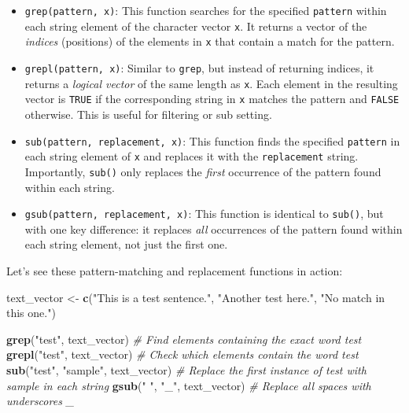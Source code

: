 \documentclass[
]{book}
\newenvironment{Shaded}{\begin{snugshade}}{\end{snugshade}}
\newcommand{\CommentTok}[1]{\textcolor[rgb]{0.56,0.35,0.01}{\textit{#1}}}
\newcommand{\FunctionTok}[1]{\textcolor[rgb]{0.13,0.29,0.53}{\textbf{#1}}}
\newcommand{\NormalTok}[1]{#1}
\newcommand{\OtherTok}[1]{\textcolor[rgb]{0.56,0.35,0.01}{#1}}
\newcommand{\StringTok}[1]{\textcolor[rgb]{0.31,0.60,0.02}{#1}}
\providecommand{\tightlist}{%
  \setlength{\itemsep}{0pt}\setlength{\parskip}{0pt}}
\begin{document}
\begin{itemize}
\tightlist
\item
  \texttt{grep(pattern,\ x)}: This function searches for the specified \texttt{pattern} within each string element of the character vector \texttt{x}. It returns a vector of the \emph{indices} (positions) of the elements in \texttt{x} that contain a match for the pattern.
\item
  \texttt{grepl(pattern,\ x)}: Similar to \texttt{grep}, but instead of returning indices, it returns a \emph{logical vector} of the same length as \texttt{x}. Each element in the resulting vector is \texttt{TRUE} if the corresponding string in \texttt{x} matches the pattern and \texttt{FALSE} otherwise. This is useful for filtering or sub setting.
\item
  \texttt{sub(pattern,\ replacement,\ x)}: This function finds the specified \texttt{pattern} in each string element of \texttt{x} and replaces it with the \texttt{replacement} string. Importantly, \texttt{sub()} only replaces the \emph{first} occurrence of the pattern found within each string.
\item
  \texttt{gsub(pattern,\ replacement,\ x)}: This function is identical to \texttt{sub()}, but with one key difference: it replaces \emph{all} occurrences of the pattern found within each string element, not just the first one.
\end{itemize}

Let's see these pattern-matching and replacement functions in action:

\begin{Shaded}
\begin{Highlighting}[]
\NormalTok{text\_vector }\OtherTok{\textless{}{-}} \FunctionTok{c}\NormalTok{(}\StringTok{"This is a test sentence."}\NormalTok{, }\StringTok{"Another test here."}\NormalTok{, }\StringTok{"No match in this one."}\NormalTok{)}

\FunctionTok{grep}\NormalTok{(}\StringTok{"test"}\NormalTok{, text\_vector)  }\CommentTok{\# Find elements containing the exact word \textquotesingle{}test\textquotesingle{}}
\FunctionTok{grepl}\NormalTok{(}\StringTok{"test"}\NormalTok{, text\_vector)  }\CommentTok{\# Check which elements contain the word \textquotesingle{}test\textquotesingle{}}
\FunctionTok{sub}\NormalTok{(}\StringTok{"test"}\NormalTok{, }\StringTok{"sample"}\NormalTok{, text\_vector)  }\CommentTok{\# Replace the first instance of \textquotesingle{}test\textquotesingle{} with \textquotesingle{}sample\textquotesingle{} in each string}
\FunctionTok{gsub}\NormalTok{(}\StringTok{" "}\NormalTok{, }\StringTok{"\_"}\NormalTok{, text\_vector)  }\CommentTok{\# Replace all spaces \textquotesingle{} \textquotesingle{} with underscores \textquotesingle{}\_\textquotesingle{}}
\end{Highlighting}
\end{Shaded}
\end{document}
